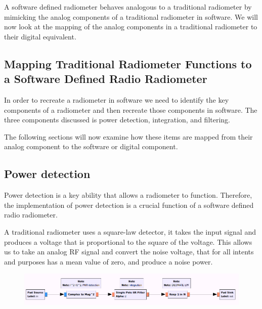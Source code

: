 A software defined radiometer behaves analogous to a traditional radiometer by mimicking the analog components of a traditional radiometer in software.  We will now look at the mapping of the analog components in a traditional radiometer to their digital equivalent.


\subsection{Mapping Traditional Radiometer Functions to a Software Defined Radio Radiometer}

In order to recreate a radiometer in software we need to identify the key components of a radiometer and then recreate those components in software.  The three components discussed is power detection, integration, and filtering.  

The following sections will now examine how these items are mapped from their analog component to the software or digital component.

\subsection{Power detection}

Power detection is a key ability that allows a radiometer to function.  Therefore, the implementation of power detection is a crucial function of a software defined radio radiometer.

A traditional radiometer uses a square-law detector, it takes the input signal and produces a voltage that is proportional to the square of the voltage.  This allows us to take an analog RF signal and convert the noise voltage, that for all intents and purposes has a mean value of zero, and produce a noise power.

{\begin{figure}[h!tb] 
\centering
\includegraphics[width=17cm]{Images/TPR_grc.png}
\label{square_block}
\end{figure}
}

